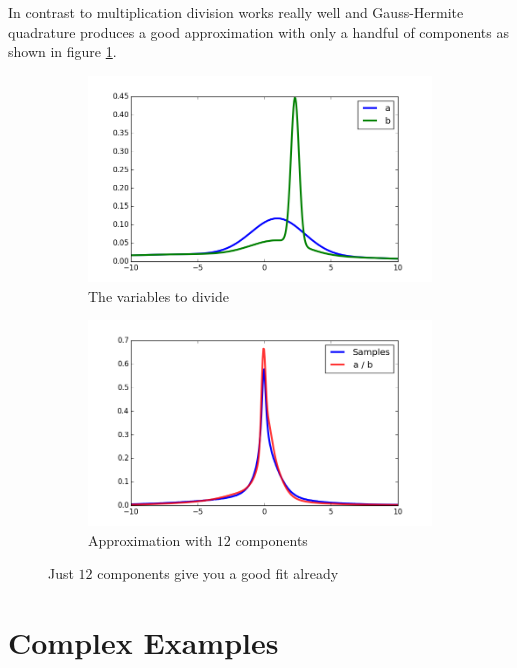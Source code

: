 \documentclass[11pt,a4paper]{book}
\begin{document}
In contrast to multiplication division works really well and Gauss-Hermite
quadrature produces a good approximation with only a handful of components as
shown in figure \ref{fig:quotient}.
\begin{figure}[h]
  \centering
  \begin{subfigure}[t]{0.45\textwidth}
    \centering
    \includegraphics[width=\textwidth]{thesis/operations/quotient-vars}
    \caption{The variables to divide}
  \end{subfigure}
  \hfill
  \begin{subfigure}[t]{0.45\textwidth}
    \centering
    \includegraphics[width=\textwidth]{thesis/operations/quotient-2-components}
    \caption{Approximation with $12$ components}
  \end{subfigure}
  \caption{Just $12$ components give you a good fit already}
  \label{fig:quotient}
\end{figure}

\section{Complex Examples}
\end{document}
